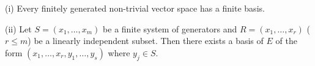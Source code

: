 (i) Every finitely generated non-trivial vector space has a finite basis.

(ii) Let $S = (x_1, \ldots, x_m)$ be a finite system of generators and $R = (x_1, \ldots, x_r)$ ($r \leq m$) be a linearly independent subset. Then there exists a basis of $E$ of the form $(x_1, \ldots, x_r, y_1, \ldots, y_s)$ where $y_j \in S$.
